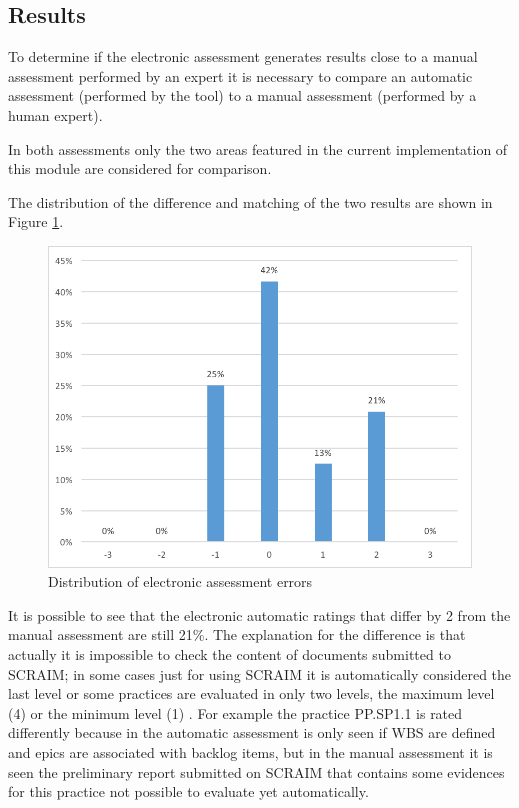 \documentclass[9pt,a4paper]{extarticle}
\begin{document}
\begin{multicols}{2}
\subsection{Results}

To determine if the electronic assessment generates results close to a manual assessment performed by an expert it is necessary to compare an automatic assessment (performed by the tool) to a manual assessment (performed by a human expert).

In both assessments only the two areas featured in the current implementation of this module are considered for comparison.

The distribution of the difference and matching of the two results are shown in Figure \ref{fig:figura2}.

\begin{figure}[H]
	\centerline{\includegraphics[scale=.5]{delta.png}}
	\caption{Distribution of electronic assessment errors}  
	\label{fig:figura2}
\end{figure}


It is possible to see that the electronic automatic ratings that differ by 2 from the manual assessment are still 21\%. The explanation for the difference is that actually it is impossible to check the content of documents submitted to SCRAIM; in some cases just for using SCRAIM  it is automatically considered the last level or some practices are evaluated in only two levels, the maximum level (4) or the minimum level (1) . For example the practice PP.SP1.1 is rated differently because in the automatic assessment is only seen if WBS are defined and epics are associated with backlog items, but in the manual assessment it is seen the preliminary report submitted on SCRAIM that contains some evidences for this practice not possible to evaluate yet
automatically.


\end{multicols}
\end{document}
